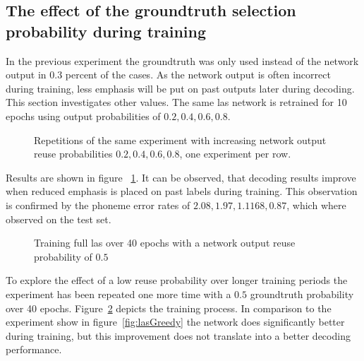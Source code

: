 \subsection{The effect of the groundtruth selection probability during training}
In the previous experiment the groundtruth was only used instead of the network output in 0.3 percent of the cases. As the network output is often incorrect during training, less emphasis will be put on past outputs later during decoding. This section investigates
other values. The same las network is retrained for 10 epochs using output probabilities of $0.2,0.4,0.6,0.8$.
\begin{figure}
\centering








\caption{Repetitions of the same experiment with increasing network output reuse probabilities $0.2, 0.4, 0.6, 0.8$, one experiment per row.}
\label{fig:lasGreedy2468}
\end{figure}
Results are shown in figure ~\ref{fig:lasGreedy2468}. It can be observed, that decoding results improve when reduced emphasis is placed on past labels during training. This observation is confirmed by the phoneme error rates of $2.08, 1.97, 1.1168, 0.87$, which where observed on the test set.
\begin{figure}[h]


\caption{Training full las over 40 epochs with a network output reuse probability of $0.5$}
\label{fig:lasGreedy05}
\end{figure}
To explore the effect of a low reuse probability over longer training periods the experiment has been repeated one more time with a $0.5$ groundtruth probability over 40 epochs.
Figure~\ref{fig:lasGreedy05} depicts the training process. In comparison to the experiment show in figure~\ref{fig:lasGreedy} the network does significantly better during training, but
this improvement does not translate into a better decoding performance.

